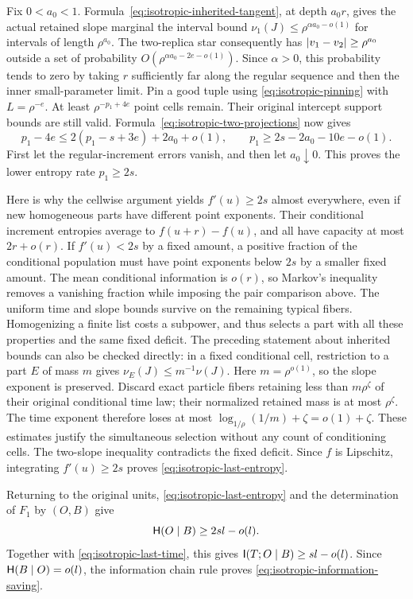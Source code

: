 Fix $0<a_0<1$. Formula~\eqref{eq:isotropic-inherited-tangent}, at depth
$a_0r$, gives the actual retained slope marginal the interval bound
$\nu_1(J)\leq\rho^{\alpha a_0-o(1)}$ for intervals of length $\rho^{a_0}$.
The two-replica star consequently has
$\lvert v_1-v_2\rvert\geq\rho^{a_0}$ outside a set of probability
$O(\rho^{\alpha a_0-2e-o(1)})$. Since $\alpha>0$, this probability tends
to zero by taking $r$ sufficiently far along the regular sequence and then
the inner small-parameter limit. Pin a good tuple using
\eqref{eq:isotropic-pinning} with $L=\rho^{-e}$. At least
$\rho^{-p_1+4e}$ point cells remain. Their original intercept support bounds
are still valid. Formula~\eqref{eq:isotropic-two-projections} now gives
\[
 p_1-4e\leq2(p_1-s+3e)+2a_0+o(1),
 \qquad p_1\geq2s-2a_0-10e-o(1).
\]
First let the regular-increment errors vanish, and then let $a_0\downarrow0$.
This proves the lower entropy rate $p_1\geq2s$.

Here is why the cellwise argument yields $f'(u)\geq2s$ almost everywhere,
even if new homogeneous parts have different point exponents. Their
conditional increment entropies average to $f(u+r)-f(u)$, and all have
capacity at most $2r+o(r)$. If $f'(u)<2s$ by a fixed amount, a positive
fraction of the conditional population must have point exponents below
$2s$ by a smaller fixed amount. The mean conditional information is $o(r)$,
so Markov's inequality removes a vanishing fraction while imposing the pair
comparison above. The uniform time and slope bounds survive on the remaining
typical fibers. Homogenizing a finite list costs a subpower, and thus selects
a part with all these properties and the same fixed deficit. The preceding
statement about inherited bounds can also be checked directly: in a fixed
conditional cell, restriction to a part $E$ of mass $m$ gives
$\nu_E(J)\leq m^{-1}\nu(J)$. Here $m=\rho^{o(1)}$, so the slope exponent
is preserved. Discard exact particle fibers retaining less than
$m\rho^\zeta$ of their original conditional time law; their normalized
retained mass is at most $\rho^\zeta$. The time exponent therefore loses
at most $\log_{1/\rho}(1/m)+\zeta=o(1)+\zeta$. These estimates justify
the simultaneous selection without any count of conditioning cells.
The two-slope inequality contradicts the fixed deficit. Since $f$ is Lipschitz,
integrating $f'(u)\geq2s$ proves \eqref{eq:isotropic-last-entropy}.

Returning to the original units, \eqref{eq:isotropic-last-entropy} and the
determination of $F_1$ by $(O,B)$ give
\[
 \mathsf H(O\mid B)\geq2sl-o(l).
\]
Together with \eqref{eq:isotropic-last-time}, this gives
$\mathsf I(T;O\mid B)\geq sl-o(l)$. Since $\mathsf H(B\mid O)=o(l)$,
the information chain rule proves \eqref{eq:isotropic-information-saving}.

